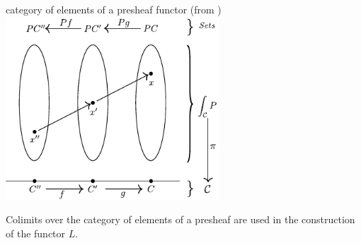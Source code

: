\begin{frame}
\begin{block}{category of elements of a presheaf functor (from \cite{Awodey2006})}
\centering\noindent\includegraphics[width=0.6\textwidth]{fig/catofel.pdf}
\end{block}
Colimits over the category of elements of a presheaf are used in the construction of the functor $L$.
\end{frame}
